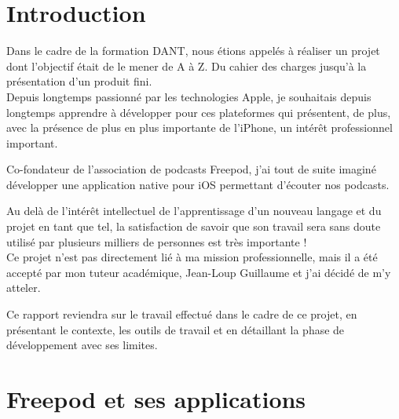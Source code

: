 \documentclass[11pt, french]{report}
\begin{document}



\tableofcontents





     								
\chapter*{Introduction}

Dans le cadre de la formation DANT, nous étions appelés à réaliser un projet dont l'objectif était de le mener de A à Z. Du cahier des charges jusqu'à la présentation d'un produit fini.\\

Depuis longtemps passionné par les technologies Apple, je souhaitais depuis longtemps apprendre à développer pour ces plateformes qui présentent, de plus, avec la présence de plus en plus importante de l'iPhone, un intérêt professionnel important.

Co-fondateur de l'association de podcasts Freepod, j'ai tout de suite imaginé développer une application native pour iOS permettant d'écouter nos podcasts.

Au delà de l'intérêt intellectuel de l'apprentissage d'un nouveau langage et du projet en tant que tel, la satisfaction de savoir que son travail sera sans doute utilisé par plusieurs milliers de personnes est très importante !\\

Ce projet n'est pas directement lié à ma mission professionnelle, mais il a été accepté par mon tuteur académique, Jean-Loup Guillaume et j'ai décidé de m'y atteler.

Ce rapport reviendra sur le travail effectué dans le cadre de ce projet, en présentant le contexte, les outils de travail et en détaillant la phase de développement avec ses limites.



\chapter{Freepod et ses applications}
\end{document}
